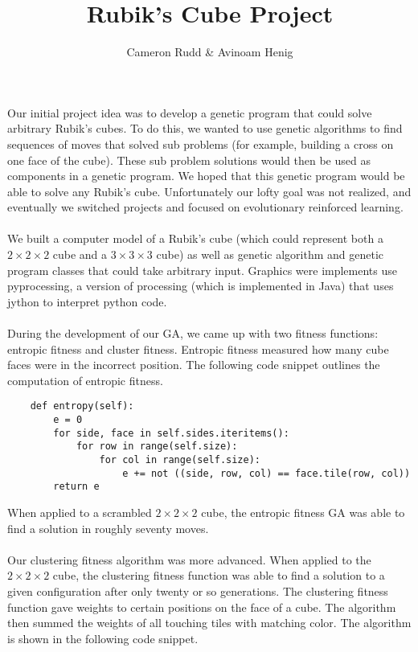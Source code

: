 \documentclass[12]{article}
\title{Rubik's Cube Project }
\author{Cameron Rudd \& Avinoam Henig}
\begin{document}
 
\maketitle

\paragraph{} Our initial project idea was to develop a genetic program that could solve arbitrary Rubik's cubes. To do this, we wanted to use genetic algorithms to find sequences of moves that solved sub problems (for example, building a cross on one face of the cube). These sub problem solutions would then be used as components in a genetic program. We hoped that this genetic program would be able to solve any Rubik's cube. Unfortunately our lofty goal was not realized, and eventually we switched projects and focused on evolutionary reinforced learning.
\paragraph{}We built a computer model of a Rubik's cube (which could represent both a $2\times2\times 2$ cube and a $3\times3\times3$ cube) as well as genetic algorithm and genetic program classes that could take arbitrary input. Graphics were implements use pyprocessing, a version of processing (which is implemented in Java) that uses jython to interpret python code. 
\paragraph{} During the development of our GA, we came up with two fitness functions: entropic fitness and cluster fitness. Entropic fitness measured how many cube faces were in the incorrect position. The following code snippet outlines the computation of entropic fitness.\\
\begin{lstlisting}
    def entropy(self):
        e = 0
        for side, face in self.sides.iteritems():
            for row in range(self.size):
                for col in range(self.size):
                    e += not ((side, row, col) == face.tile(row, col))
        return e
\end{lstlisting}
When applied to a scrambled $2\times 2 \times 2$ cube, the entropic fitness GA was able to find a solution in roughly seventy moves. 

\paragraph{} Our clustering fitness algorithm was more advanced. When applied to the $2\times2\times2$ cube, the clustering fitness function was able to find a solution to a given configuration after only twenty or so generations. The clustering fitness function gave weights to certain positions on the face of a cube. The algorithm then summed the weights of all touching tiles with matching color. The algorithm is shown in the following code snippet.\\
\end{document}
